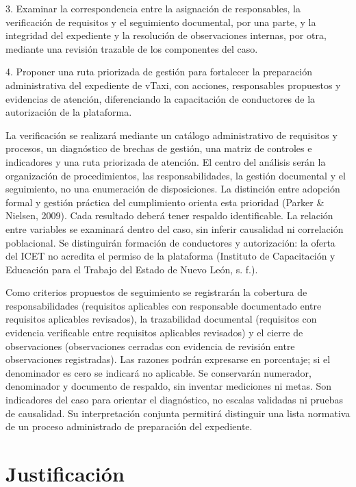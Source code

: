 {3. Examinar la correspondencia entre la asignación de responsables, la verificación de requisitos y el seguimiento documental, por una parte, y la integridad del expediente y la resolución de observaciones internas, por otra, mediante una revisión trazable de los componentes del caso.


4. Proponer una ruta priorizada de gestión para fortalecer la preparación administrativa del expediente de vTaxi, con acciones, responsables propuestos y evidencias de atención, diferenciando la capacitación de conductores de la autorización de la plataforma.


La verificación se realizará mediante un catálogo administrativo de requisitos y procesos, un diagnóstico de brechas de gestión, una matriz de controles e indicadores y una ruta priorizada de atención. El centro del análisis serán la organización de procedimientos, las responsabilidades, la gestión documental y el seguimiento, no una enumeración de disposiciones. La distinción entre adopción formal y gestión práctica del cumplimiento orienta esta prioridad (Parker \& Nielsen, 2009). Cada resultado deberá tener respaldo identificable. La relación entre variables se examinará dentro del caso, sin inferir causalidad ni correlación poblacional. Se distinguirán formación de conductores y autorización: la oferta del ICET no acredita el permiso de la plataforma (Instituto de Capacitación y Educación para el Trabajo del Estado de Nuevo León, s. f.).

Como criterios propuestos de seguimiento se registrarán la cobertura de responsabilidades (requisitos aplicables con responsable documentado entre requisitos aplicables revisados), la trazabilidad documental (requisitos con evidencia verificable entre requisitos aplicables revisados) y el cierre de observaciones (observaciones cerradas con evidencia de revisión entre observaciones registradas). Las razones podrán expresarse en porcentaje; si el denominador es cero se indicará no aplicable. Se conservarán numerador, denominador y documento de respaldo, sin inventar mediciones ni metas. Son indicadores del caso para orientar el diagnóstico, no escalas validadas ni pruebas de causalidad. Su interpretación conjunta permitirá distinguir una lista normativa de un proceso administrado de preparación del expediente.


\section{Justificación}
}
